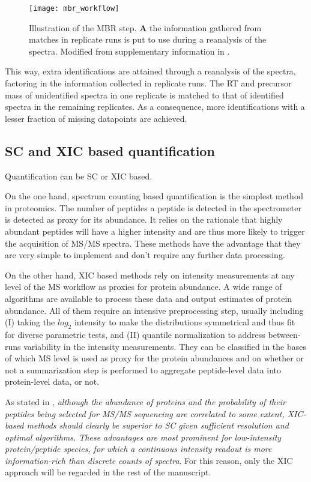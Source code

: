 \documentclass[thesis]{subfiles}
\begin{document}
\begin{figure}[!h]
\centering
\texttt{[image: mbr\_workflow]}
\caption{Illustration of the \ac{MBR} step. \textbf{A} the information gathered from matches in replicate runs is put to use during a reanalysis of the spectra. Modified from supplementary information in \cite{Argentini2016}.}
\label{figure:moff_mbr}
\end{figure}

This way, extra identifications are attained through a reanalysis of the spectra, factoring in the information collected in replicate runs. The RT and precursor mass of unidentified spectra in one replicate is matched to that of identified spectra in the remaining replicates. As a consequence, more identifications with a lesser fraction of missing datapoints are achieved.


\subsection{SC and XIC based quantification}
\label{subsec:scvsxic}


Quantification can be \ac{SC} or \ac{XIC} based.

On the one hand, spectrum counting based quantification is the simplest method in proteomics. The number of peptides a peptide is detected in the spectrometer is detected as proxy for its abundance. It relies on the rationale that highly abundant peptides will have a higher intensity and are thus more likely to trigger the acquisition of MS/MS spectra. These methods have the advantage that they are very simple to implement and don't require any further data processing.

On the other hand, \ac{XIC} based methods rely on intensity measurements at any level of the \ac{MS} workflow as proxies for protein abundance. A wide range of algorithms are available to process these data and output estimates of protein abundance. All of them require an intensive preprocessing step, usually including (I) taking the $log_2$ intensity to make the distributions symmetrical and thus fit for diverse parametric tests, and (II) quantile normalization to address between-runs variability in the intensity measurements. They can be classified in the bases of which MS level is used as proxy for the protein abundances and on whether or not a summarization step is performed to aggregate peptide-level data into protein-level data, or not. 


As stated in \cite{Cox2014}, \textit{although the abundance of proteins and the probability of their peptides being selected for \ac{MS/MS} sequencing are correlated to some extent, \ac{XIC}-based methods should clearly be superior to \ac{SC} given sufficient resolution and optimal algorithms. These advantages are most prominent for low-intensity protein/peptide species, for which a continuous intensity readout is more information-rich than discrete counts of spectra}. For this reason, only the \ac{XIC} approach will be regarded in the rest of the manuscript.  
\end{document}

